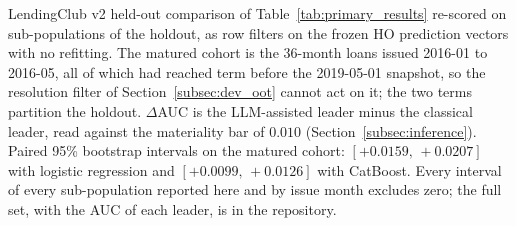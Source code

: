 \documentclass[final,5p,twocolumn]{elsarticle}
\providecommand{\DIFdeltex}[1]{{\protect\color{red} \scriptsize #1}} %
\providecommand{\DIFdelbegin}{} %
\providecommand{\DIFdelFL}[1]{\DIFdel{#1}} %
\providecommand{\DIFdel}[1]{\texorpdfstring{\DIFdeltex{#1}}{}} %
\begin{document}
\DIFdelbegin %
\DIFdelFL{LendingClub v2 held-out comparison of Table~\ref{tab:primary_results} re-scored on sub-populations of the holdout, as row filters on the frozen HO prediction vectors with no refitting. The matured cohort is the 36-month loans issued 2016-01 to 2016-05, all of which had reached term before the 2019-05-01 snapshot, so the resolution filter of Section~\ref{subsec:dev_oot} cannot act on it; the two terms partition the holdout. $\Delta$AUC is the LLM-assisted leader minus the classical leader, read against the materiality bar of $0.010$ (Section~\ref{subsec:inference}).}%
\DIFdelFL{Paired 95\% bootstrap intervals on the matured cohort: $[+0.0159,\,+0.0207]$ with logistic regression and $[+0.0099,\,+0.0126]$ with CatBoost. Every interval of every sub-population reported here and by issue month excludes zero; the full set, with the AUC of each leader, is in the repository.
}%
\end{document}
